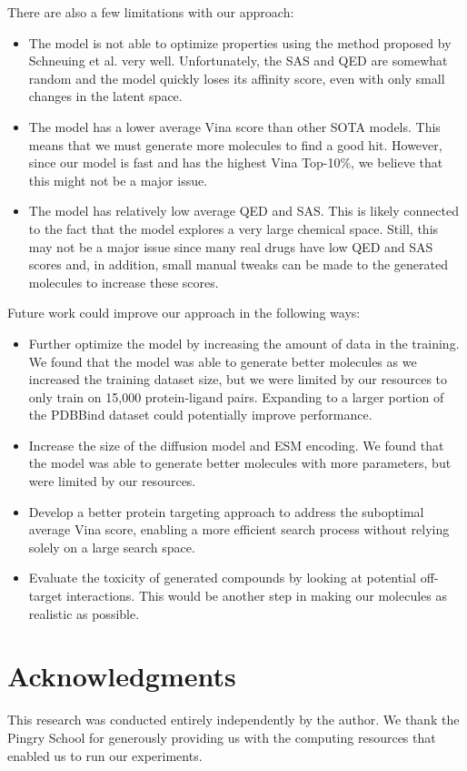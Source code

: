 \documentclass[11pt]{article}
\begin{document}
There are also a few limitations with our approach:
\begin{itemize}
    \item The model is not able to optimize properties using the method proposed by 
          Schneuing et al. \cite{schneuing2023} very well. Unfortunately, the SAS and 
          QED are somewhat random and the model quickly loses its affinity score, even with 
          only small changes in the latent space.
    \item The model has a lower average Vina score than other SOTA models. This means that 
          we must generate more molecules to find a good hit. However, since our model is 
          fast and has the highest Vina Top-10\%, we believe that this might not be a major issue.
    \item The model has relatively low average QED and SAS. This is likely connected to the fact 
          that the model explores a very large chemical space. Still, this may not be a major issue 
          since many real drugs have low QED and SAS scores and, in addition, small manual tweaks 
          can be made to the generated molecules to increase these scores.
\end{itemize} 


Future work could improve our approach in the following ways:
\begin{itemize}
    \item Further optimize the model by increasing the amount of data in the training. We found that 
          the model was able to generate better molecules as we increased the training dataset size, 
          but we were limited by our resources to only train on 15,000 protein-ligand pairs. Expanding to 
          a larger portion of the PDBBind dataset could potentially improve performance.
    \item Increase the size of the diffusion model and ESM encoding. We found that the model was able to 
          generate better molecules with more parameters, but were limited by our resources. 
    \item Develop a better protein targeting approach to address the suboptimal average Vina score, enabling 
          a more efficient search process without relying solely on a large search space.
    \item Evaluate the toxicity of generated compounds by looking at potential off-target interactions. This would 
          be another step in making our molecules as realistic as possible.
\end{itemize}

\section{Acknowledgments}
This research was conducted entirely independently by the author.
We thank the Pingry School for generously providing us with 
the computing resources that enabled us to run our experiments.



\end{document}
